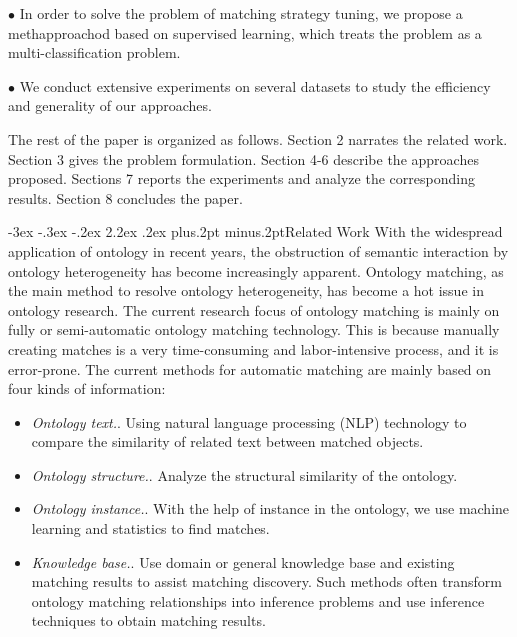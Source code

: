 \documentclass[twoside]{article}
\makeatletter
\def\section{\@startsection{section}{1}{\z@}%
 {-3ex \@plus -.3ex \@minus -.2ex}%
 {2.2ex \@plus.2ex}%
{\normalfont\normalsize\protect\baselineskip=14.5pt plus.2pt minus.2pt\bfseries}}
\makeatother
\begin{document}
$\bullet$ In order to solve the problem of matching strategy tuning, we propose a methapproachod based on supervised learning, which treats the problem as a multi-classification problem.

$\bullet$ We conduct extensive experiments on several datasets to study the efficiency and generality of our approaches.


The rest of the paper is organized as follows. Section 2 narrates the related work. Section 3 gives the problem formulation. Section 4-6 describe the approaches proposed. Sections 7 reports the experiments and analyze the corresponding results. Section 8 concludes the paper.

\section{Related Work}
With the widespread application of ontology in recent years, the obstruction of semantic interaction by ontology heterogeneity has become increasingly apparent. Ontology matching, as the main method to resolve ontology heterogeneity, has become a hot issue in ontology research\cite{wwy14,wwy15,wwy16,wwy17,wwy18,wwy19}. The current research focus of ontology matching is mainly on fully or semi-automatic ontology matching technology. This is because manually creating matches is a very time-consuming and labor-intensive process, and it is error-prone\cite{wwy20}. The current methods for automatic matching are mainly based on four kinds of information\cite{wwy21,wwy22}:
\begin {itemize}
\item {\it Ontology text.}\cite{wwy23,wwy24}. Using natural language processing (NLP) technology to compare the similarity of related text between matched objects.
\item {\it Ontology structure.}\cite{wwy25,wwy26}. Analyze the structural similarity of the ontology.
\item {\it  Ontology instance.}\cite{wwy27,wwy28}. With the help of instance in the ontology, we use machine learning and statistics to find matches.
\item {\it Knowledge base.}\cite{wwy29,wwy30}. Use domain or general knowledge base and existing matching results to assist matching discovery. Such methods often transform ontology matching relationships into inference problems and use inference techniques to obtain matching results.
\end {itemize}
\end{document}
